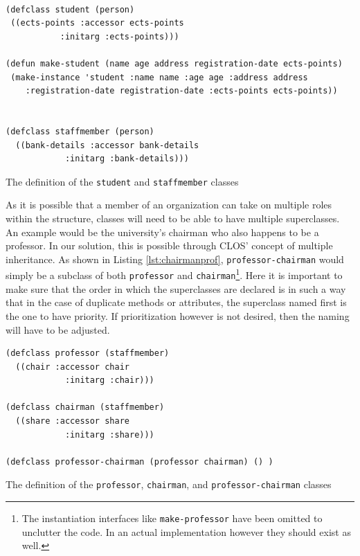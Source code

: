 \documentclass[oribibl]{llncs}
\begin{document}
\begin{listing}[]%
 \centering
\begin{verbatim}

(defclass student (person)
 ((ects-points :accessor ects-points
           :initarg :ects-points)))

(defun make-student (name age address registration-date ects-points)
 (make-instance 'student :name name :age age :address address
    :registration-date registration-date :ects-points ects-points))
    
    
(defclass staffmember (person)
  ((bank-details :accessor bank-details
            :initarg :bank-details)))

\end{verbatim}
\caption{The definition of the \texttt{student} and \texttt{staffmember} classes}
\label{lst:student}
\end{listing}


As it is possible that a member of an organization can take on multiple roles within the structure, classes will need to be able to have multiple superclasses. An example would be the university's chairman who also happens to be a professor. In our solution, this is possible through CLOS' concept of multiple inheritance. As shown in Listing \ref{lst:chairmanprof}, \texttt{professor-chairman} would simply be a subclass of both \texttt{professor} and \texttt{chairman}\footnote{The instantiation interfaces like \texttt{make-professor} have been omitted to unclutter the code. In an actual implementation however they should exist as well.}. Here it is important to make sure that the order in which the superclasses are declared is in such a way that in the case of duplicate methods or attributes, the superclass named first is the one to have priority. If prioritization however is not desired, then the naming will have to be adjusted.

\begin{listing}[]%
 \centering
\begin{verbatim}
(defclass professor (staffmember)
  ((chair :accessor chair
            :initarg :chair)))

(defclass chairman (staffmember)
  ((share :accessor share
            :initarg :share)))

(defclass professor-chairman (professor chairman) () )

\end{verbatim}
\caption{The definition of the \texttt{professor}, \texttt{chairman}, and \texttt{professor-chairman} classes}
\label{lst:chairmanprof}
\end{listing}
\end{document}
